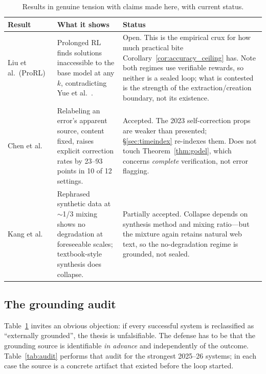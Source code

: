 \documentclass[11pt,a4paper]{article}
\newcommand{\toprule}{\hline}
\newcommand{\midrule}{\hline}
\newcommand{\bottomrule}{\hline}
\begin{document}
\begin{table}[h]
\centering
\small
\begin{tabular}{@{}p{4.0cm}p{4.9cm}p{5.2cm}@{}}
\toprule
\textbf{Result} & \textbf{What it shows} & \textbf{Status} \\
\midrule
Liu et al.\ (ProRL)~\cite{liu2025prorl} &
Prolonged RL finds solutions inaccessible to the base model at any $k$, contradicting Yue et al.~\cite{yue2025rlvr}. &
Open. This is the empirical crux for how much practical bite Corollary~\ref{cor:accuracy_ceiling} has. Note both regimes use verifiable rewards, so neither is a sealed loop; what is contested is the strength of the extraction/creation boundary, not its existence. \\[3pt]
Chen et al.~\cite{chen2026selfcorrection} &
Relabeling an error's apparent source, content fixed, raises explicit correction rates by 23--93 points in 10 of 12 settings. &
Accepted. The 2023 self-correction props are weaker than presented; \S\ref{sec:timeindex} re-indexes them. Does not touch Theorem~\ref{thm:godel}, which concerns \emph{complete} verification, not error flagging. \\[3pt]
Kang et al.~\cite{kang2025demystifying} &
Rephrased synthetic data at $\sim$1/3 mixing shows no degradation at foreseeable scales; textbook-style synthesis does collapse. &
Partially accepted. Collapse depends on synthesis method and mixing ratio---but the mixture again retains natural web text, so the no-degradation regime is grounded, not sealed. \\
\bottomrule
\end{tabular}
\caption{Results in genuine tension with claims made here, with current status.}
\label{tab:tension}
\end{table}


\subsection{The grounding audit}
\label{sec:grounding_audit}

Table~\ref{tab:tension} invites an obvious objection: if every successful system is reclassified as ``externally grounded'', the thesis is unfalsifiable. The defense has to be that the grounding source is identifiable \emph{in advance} and independently of the outcome. Table~\ref{tab:audit} performs that audit for the strongest 2025--26 systems; in each case the source is a concrete artifact that existed before the loop started.
\end{document}
